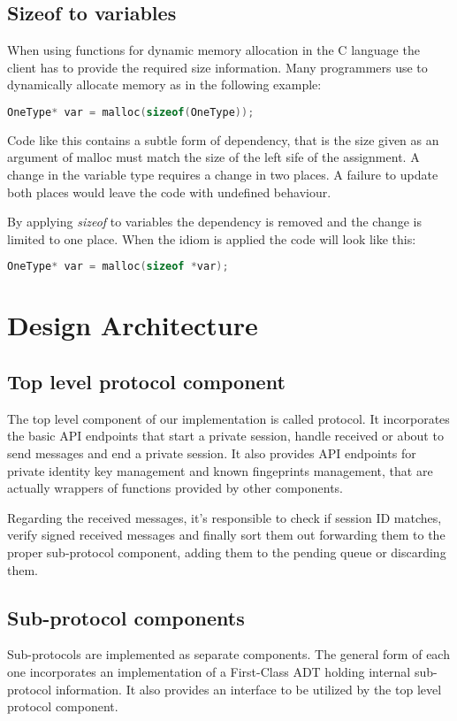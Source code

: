 \subsection{Sizeof to variables}
When using functions for dynamic memory allocation in the C language the client has to provide the required size information. Many programmers use to dynamically allocate memory as in the following example:
\begin{lstlisting}[language=C]
OneType* var = malloc(sizeof(OneType));
\end{lstlisting}

Code like this contains a subtle form of dependency, that is the size given as an argument of malloc must match the size of the left sife of the assignment. A change in the variable type requires a change in two places. A failure to update both places would leave the code with undefined behaviour.

By applying \textit{sizeof} to variables the dependency is removed and the change is limited to one place. When the idiom is applied the code will look like this:
\begin{lstlisting}[language=C]
OneType* var = malloc(sizeof *var);
\end{lstlisting}

\section{Design Architecture}

\subsection{Top level protocol component}
The top level component of our implementation is called protocol. It incorporates the basic API endpoints that start a private session, handle received or about to send messages and end a private session. It also provides API endpoints for private identity key management and known fingeprints management, that are actually wrappers of functions provided by other components.

Regarding the received messages, it's responsible to check if session ID matches, verify signed received messages and finally sort them out forwarding them to the proper sub-protocol component, adding them to the pending queue or discarding them.

\subsection{Sub-protocol components}
Sub-protocols are implemented as separate components. The general form of each one incorporates an implementation of a First-Class ADT holding internal sub-protocol information. It also provides an interface to be utilized by the top level protocol component.

